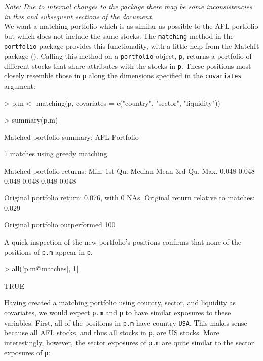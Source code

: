 \documentclass{article}
\begin{document}
\emph{Note: Due to internal changes to the package there may be some
  inconsistencies in this and subsequent sections of the document.}\\

We want a matching portfolio which is as similar as possible to the
AFL portfolio but which does not include the same stocks.  The
\texttt{matching} method in the \texttt{portfolio} package provides
this functionality, with a little help from the MatchIt package
(\cite{matchit.pkg}).  Calling this method on a \texttt{portfolio}
object, \texttt{p}, returns a portfolio of different stocks that share
attributes with the stocks in \texttt{p}.  These positions most
closely resemble those in \texttt{p} along the dimensions specified in
the \texttt{covariates} argument:

\begin{Schunk}
\begin{Sinput}
> p.m <- matching(p, covariates = c("country", "sector", "liquidity"))
\end{Sinput}
\end{Schunk}
\begin{Schunk}
\begin{Sinput}
> summary(p.m)
\end{Sinput}
\begin{Soutput}
Matched portfolio summary: AFL Portfolio

1 matches using greedy matching.

Matched portfolio returns:
   Min. 1st Qu.  Median    Mean 3rd Qu.    Max. 
  0.048   0.048   0.048   0.048   0.048   0.048 

Original portfolio return: 0.076, with 0 NAs.
Original return relative to matches: 0.029

Original portfolio outperformed 100% of matches.
\end{Soutput}
\end{Schunk}

A quick inspection of the new portfolio's positions confirms that none
of the positions of \texttt{p.m} appear in \texttt{p}.

\begin{Schunk}
\begin{Sinput}
> all(!p.m@matches[, 1] %in% p@weights$id)
\end{Sinput}
\begin{Soutput}
[1] TRUE
\end{Soutput}
\end{Schunk}

Having created a matching portfolio using country, sector, and
liquidity as covariates, we would expect \texttt{p.m} and \texttt{p}
to have similar exposures to these variables.  First, all of the
positions in \texttt{p.m} have country \texttt{USA}.  This makes sense
because all AFL stocks, and thus all stocks in \texttt{p}, are US
stocks.  More interestingly, however, the sector exposures of
\texttt{p.m} are quite similar to the sector exposures of \texttt{p}:
\end{document}
